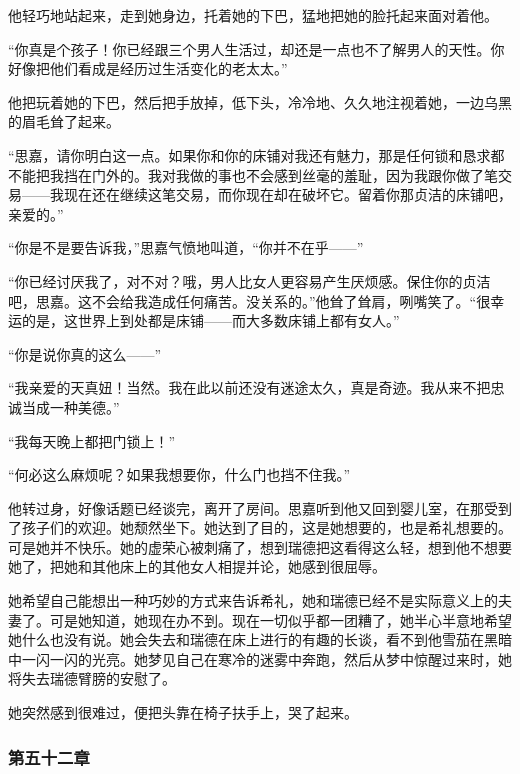 \par 他轻巧地站起来，走到她身边，托着她的下巴，猛地把她的脸托起来面对着他。
\par “你真是个孩子！你已经跟三个男人生活过，却还是一点也不了解男人的天性。你好像把他们看成是经历过生活变化的老太太。”
\par 他把玩着她的下巴，然后把手放掉，低下头，冷冷地、久久地注视着她，一边乌黑的眉毛耸了起来。
\par “思嘉，请你明白这一点。如果你和你的床铺对我还有魅力，那是任何锁和恳求都不能把我挡在门外的。我对我做的事也不会感到丝毫的羞耻，因为我跟你做了笔交易——我现在还在继续这笔交易，而你现在却在破坏它。留着你那贞洁的床铺吧，亲爱的。”
\par “你是不是要告诉我，”思嘉气愤地叫道，“你并不在乎——”
\par “你已经讨厌我了，对不对？哦，男人比女人更容易产生厌烦感。保住你的贞洁吧，思嘉。这不会给我造成任何痛苦。没关系的。”他耸了耸肩，咧嘴笑了。“很幸运的是，这世界上到处都是床铺——而大多数床铺上都有女人。”
\par “你是说你真的这么——”
\par “我亲爱的天真妞！当然。我在此以前还没有迷途太久，真是奇迹。我从来不把忠诚当成一种美德。”
\par “我每天晚上都把门锁上！”
\par “何必这么麻烦呢？如果我想要你，什么门也挡不住我。”
\par 他转过身，好像话题已经谈完，离开了房间。思嘉听到他又回到婴儿室，在那受到了孩子们的欢迎。她颓然坐下。她达到了目的，这是她想要的，也是希礼想要的。可是她并不快乐。她的虚荣心被刺痛了，想到瑞德把这看得这么轻，想到他不想要她了，把她和其他床上的其他女人相提并论，她感到很屈辱。
\par 她希望自己能想出一种巧妙的方式来告诉希礼，她和瑞德已经不是实际意义上的夫妻了。可是她知道，她现在办不到。现在一切似乎都一团糟了，她半心半意地希望她什么也没有说。她会失去和瑞德在床上进行的有趣的长谈，看不到他雪茄在黑暗中一闪一闪的光亮。她梦见自己在寒冷的迷雾中奔跑，然后从梦中惊醒过来时，她将失去瑞德臂膀的安慰了。
\par 她突然感到很难过，便把头靠在椅子扶手上，哭了起来。

\subsubsection{第五十二章}

